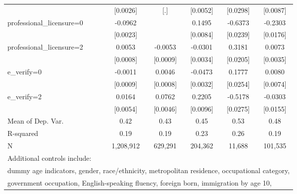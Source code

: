 \begin{table}[htbp]
\begin{tabular}{l*{5}{c}}
                    &    [0.0026]         &         [.]         &    [0.0052]         &    [0.0298]         &    [0.0087]         \\
\addlinespace
professional\_licensure=0&     -0.0962\sym{***}&                     &      0.1495\sym{***}&     -0.6373\sym{***}&     -0.2303\sym{***}\\
                    &    [0.0023]         &                     &    [0.0084]         &    [0.0239]         &    [0.0176]         \\
\addlinespace
professional\_licensure=2&      0.0053\sym{***}&     -0.0053\sym{***}&     -0.0301\sym{***}&      0.3181\sym{***}&      0.0073\sym{**} \\
                    &    [0.0008]         &    [0.0009]         &    [0.0034]         &    [0.0205]         &    [0.0035]         \\
\addlinespace
e\_verify=0          &     -0.0011         &      0.0046\sym{***}&     -0.0473\sym{***}&      0.1777\sym{***}&      0.0080         \\
                    &    [0.0009]         &    [0.0008]         &    [0.0032]         &    [0.0254]         &    [0.0074]         \\
\addlinespace
e\_verify=2          &      0.0164\sym{***}&      0.0762\sym{***}&      0.2205\sym{***}&     -0.5178\sym{***}&     -0.0303\sym{*}  \\
                    &    [0.0054]         &    [0.0046]         &    [0.0096]         &    [0.0275]         &    [0.0155]         \\
\midrule
Mean of Dep. Var.   &        0.42         &        0.43         &        0.45         &        0.53         &        0.48         \\
R-squared           &        0.19         &        0.19         &        0.23         &        0.26         &        0.19         \\
N                   &   1,208,912         &     629,291         &     204,362         &      11,688         &     101,535         \\
\bottomrule
\multicolumn{6}{l}{\footnotesize Additional controls include:}\\
\multicolumn{6}{l}{\footnotesize dummy age indicators, gender, race/ethnicity, metropolitan residence, occupational category,}\\
\multicolumn{6}{l}{\footnotesize government occupation, English-speaking fluency, foreign born, immigration by age 10,}\\

\end{tabular}
\end{table}

